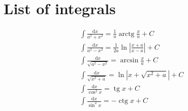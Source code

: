 \newcommand{\ud}{\mathrm{d}}
\DeclareMathOperator{\tg}{tg}
\DeclareMathOperator{\ctg}{ctg}
\DeclareMathOperator{\arctg}{arctg}

\section{List of integrals}
\begin{align*}
	\int \frac{\ud x}{a^2 + x^2} = \frac{1}{a} \arctg \frac{x}{a} + C \\
    \int \frac{\ud x}{a^2 - x^2} = \frac{1}{2a} \ln \left\lvert \frac{x + a}{x - a} \right\rvert + C \\
    \int \frac{\ud x}{\sqrt{a^2 - x^2}} = \arcsin \frac{x}{a} + C \\
    \int \frac{\ud x}{\sqrt{x^2 + a}} = \ln \left\lvert x + \sqrt{x^2 + a} \right\rvert + C \\
    \int \frac{\ud x}{\cos^2 x} = \tg x + C \\
    \int \frac{\ud x}{\sin^2 x} = -\ctg x + C
\end{align*}
